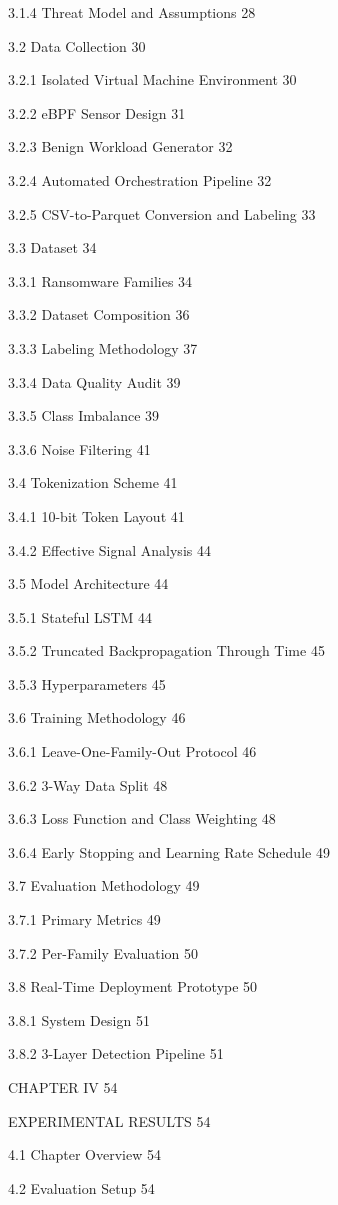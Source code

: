 3.1.4  Threat Model and Assumptions	28

3.2  Data Collection	30

3.2.1  Isolated Virtual Machine Environment	30

3.2.2  eBPF Sensor Design	31

3.2.3  Benign Workload Generator	32

3.2.4  Automated Orchestration Pipeline	32

3.2.5  CSV-to-Parquet Conversion and Labeling	33

3.3  Dataset	34

3.3.1  Ransomware Families	34

3.3.2  Dataset Composition	36

3.3.3  Labeling Methodology	37

3.3.4  Data Quality Audit	39

3.3.5  Class Imbalance	39

3.3.6  Noise Filtering	41

3.4  Tokenization Scheme	41

3.4.1  10-bit Token Layout	41

3.4.2  Effective Signal Analysis	44

3.5  Model Architecture	44

3.5.1  Stateful \textmu{}LSTM	44

3.5.2  Truncated Backpropagation Through Time	45

3.5.3  Hyperparameters	45

3.6  Training Methodology	46

3.6.1  Leave-One-Family-Out Protocol	46

3.6.2  3-Way Data Split	48

3.6.3  Loss Function and Class Weighting	48

3.6.4  Early Stopping and Learning Rate Schedule	49

3.7  Evaluation Methodology	49

3.7.1  Primary Metrics	49

3.7.2  Per-Family Evaluation	50

3.8  Real-Time Deployment Prototype	50

3.8.1  System Design	51

3.8.2  3-Layer Detection Pipeline	51

CHAPTER IV	54

EXPERIMENTAL RESULTS	54

4.1  Chapter Overview	54

4.2  Evaluation Setup	54

